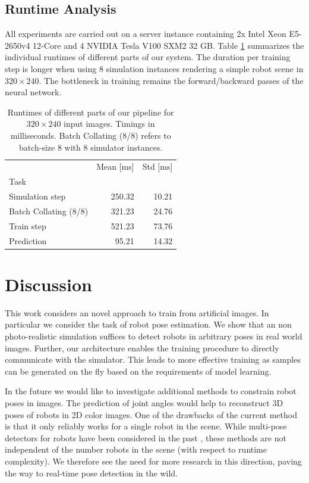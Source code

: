 \documentclass[conference]{IEEEtran}
\begin{document}
    \subsection{Runtime Analysis}
    All experiments are carried out on a server instance containing 2x Intel Xeon E5-2650v4 12-Core and 4 NVIDIA Tesla V100 SXM2 32 GB. Table \ref{tab:runtime} summarizes the individual runtimes of different parts of our system. The duration per training step is longer when using 8 simulation instances rendering a simple robot scene in $320 \times 240$. The bottleneck in training remains the forward/backward passes of the neural network.

    \begin{table}
        \centering
        \begin{tabular}{lrr}
            \toprule
            {} &  Mean [ms] &  Std [ms] \\
            Task                   &            &           \\
            \midrule
            Simulation step        &      250.32 &    10.21  \\
            Batch Collating (8/8)  &      321.23 &    24.76  \\
            Train step             &      521.23 &   73.76  \\
            Prediction             &      95.21 &    14.32 \\
            \bottomrule
        \end{tabular}
        \caption{
            \label{tab:runtime} 
            Runtimes of different parts of our pipeline for $320 \times 240$ input images. Timings in milliseconds. Batch Collating (8/8) refers to batch-size 8 with 8 simulator instances.
        }
    \end{table}

\section{Discussion}
This work considers an novel approach to train from artificial images. In particular we consider the task of robot pose estimation. We show that an non photo-realistic simulation suffices to detect robots in arbitrary poses in real world images. Further, our architecture enables the training procedure to directly communicate with the simulator. This leads to more effective training as samples can be generated on the fly based on the requirements of model learning.

In the future we would like to investigate additional methods to constrain robot poses in images. The prediction of joint angles would help to reconstruct 3D poses of robots in 2D color images. One of the drawbacks of the current method is that it only reliably works for a single robot in the scene. While multi-pose detectors for robots have been considered in the past \cite{cheind2019disp}, these methods are not independent of the number robots in the scene (with respect to runtime complexity). We therefore see the need for more research in this direction, paving the way to real-time pose detection in the wild.
\end{document}
